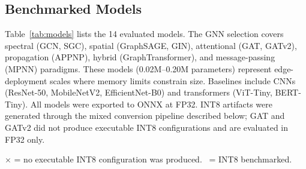 \documentclass[conference]{IEEEtran}
\begin{document}
\subsection{Benchmarked Models}
Table~\ref{tab:models} lists the 14 evaluated models. The GNN selection covers spectral (GCN, SGC), spatial (GraphSAGE, GIN), attentional (GAT, GATv2), propagation (APPNP), hybrid (GraphTransformer), and message-passing (MPNN) paradigms. These models (0.02M--0.20M parameters) represent edge-deployment scales where memory limits constrain size. Baselines include CNNs (ResNet-50, MobileNetV2, EfficientNet-B0) and transformers (ViT-Tiny, BERT-Tiny). All models were exported to ONNX at FP32. INT8 artifacts were generated through the mixed conversion pipeline described below; GAT and GATv2 did not produce executable INT8 configurations and are evaluated in FP32 only.

\begin{table}[htbp]
\caption{Evaluated Models and Characteristics}
\begin{center}
\label{tab:models}
\end{center}
\footnotesize{$\times$ = no executable INT8 configuration was produced. \checkmark\ = INT8 benchmarked.}
\end{table}
\end{document}
